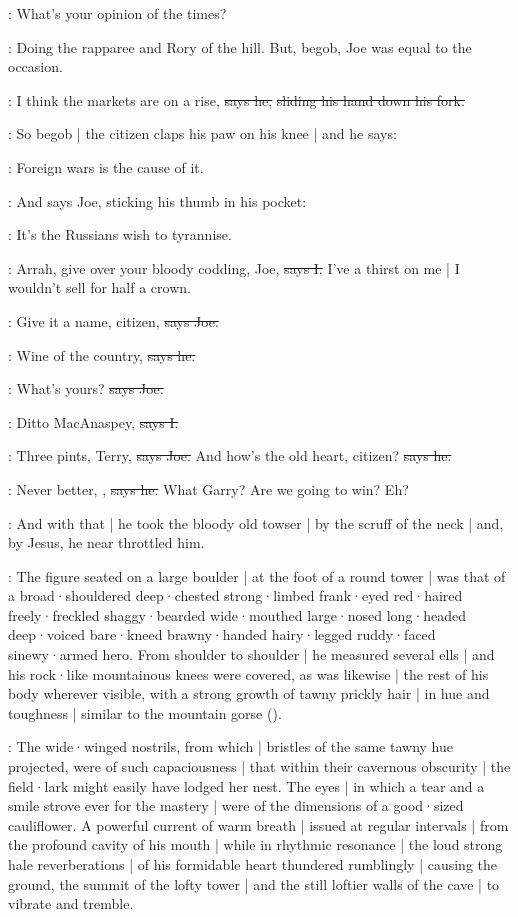 \citizen:
What's your opinion of the times?

\Nq:
Doing the rapparee and Rory of the hill.
But,
begob,
Joe was equal to the occasion.

\joe:
I think the markets are on a rise,
\sout{says he,}
\sout{sliding his hand down his fork.}

\Nq:
So begob |
the citizen claps his paw on his knee |
and he says:

\citizen:
Foreign wars is the cause of it.

\Nq:
And says Joe,
sticking his thumb in his pocket:

\joe:
It's the Russians wish to tyrannise.

:
Arrah,
give over your bloody codding,
Joe,
\sout{says I.}
I've a thirst on me |
I wouldn't sell for half a crown.

\joe:
Give it a name,
citizen,
\sout{says Joe.}

\citizen:
Wine of the country,
\sout{says he.}

\joe:
What's yours?
\sout{says Joe.}

:
Ditto MacAnaspey,
\sout{says I.}

\joe:
Three pints,
Terry,
\sout{says Joe.}
And how's the old heart,
citizen?
\sout{says he.}

\citizen:
Never better,
,
\sout{says he.}
What Garry?
Are we going to win?
Eh?

\Nq:
And with that |
he took the bloody old towser |
by the scruff of the neck |
and,
by Jesus,
he near throttled him.

:
The figure seated on a large boulder |
at the foot of a round tower |
was that of
a broad·shouldered
deep·chested
strong·limbed
frank·eyed
red·haired
freely·freckled
shaggy·bearded
wide·mouthed
large·nosed
long·headed
deep·voiced
bare·kneed
brawny·handed
hairy·legged
ruddy·faced
sinewy·armed hero.
From shoulder to shoulder |
he measured several ells |
and his rock·like mountainous knees were covered,
as was likewise |
the rest of his body wherever visible,
with a strong growth of tawny prickly hair |
in hue and toughness |
similar to the mountain gorse
().

:
The wide·winged nostrils,
from which |
bristles of the same tawny hue projected,
were of such capaciousness
 |
that within their cavernous obscurity |
the field·lark might easily have lodged her nest.
The eyes |
in which a tear and a smile strove ever for the mastery |
were of the dimensions of a good·sized cauliflower.
A powerful current of warm breath |
issued at regular intervals |
from the profound cavity of his mouth |
while in rhythmic resonance |
the loud strong hale reverberations |
of his formidable heart thundered rumblingly |
causing the ground,
the summit of the lofty tower |
and the still loftier walls of the cave |
to vibrate and tremble.


